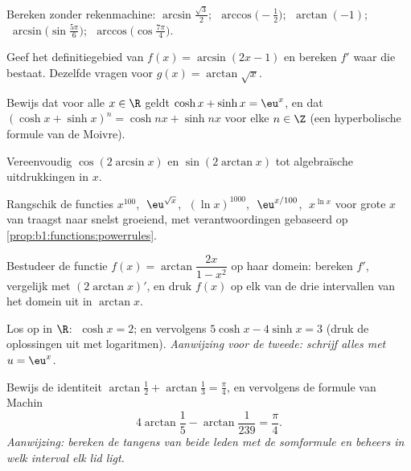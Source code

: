 \begin{exercise}[$\star$]\label{exo:b1:functions:1}
Bereken zonder rekenmachine: $\arcsin\frac{\sqrt 3}{2}$;
$\;\arccos\bigl(-\frac 12\bigr)$; $\;\arctan(-1)$;
$\;\arcsin\bigl(\sin\frac{5\pi}{6}\bigr)$;
$\;\arccos\bigl(\cos\frac{7\pi}{4}\bigr)$.
\end{exercise}

\begin{exercise}[$\star$]\label{exo:b1:functions:2}
Geef het definitiegebied van $f(x) = \arcsin(2x - 1)$ en bereken $f'$
waar die bestaat. Dezelfde vragen voor $g(x) = \arctan\sqrt{x}$.
\end{exercise}

\begin{exercise}[$\star$]\label{exo:b1:functions:3}
Bewijs dat voor alle $x \in \R$ geldt $\cosh x + \sinh x = \eu^x$, en dat
$(\cosh x + \sinh x)^n = \cosh nx + \sinh nx$ voor elke $n \in \Z$ (een
hyperbolische formule van de Moivre).
\end{exercise}

\begin{exercise}[$\star$]\label{exo:b1:functions:4}
Vereenvoudig $\cos(2\arcsin x)$ en $\sin(2\arctan x)$ tot algebraïsche
uitdrukkingen in $x$.
\end{exercise}

\begin{exercise}[$\star$]\label{exo:b1:functions:5}
Rangschik de functies $x^{100}$, $\;\eu^{\sqrt x}$, $\;(\ln x)^{1000}$,
$\;\eu^{x/100}$, $\;x^{\ln x}$ voor grote $x$ van traagst naar snelst
groeiend, met verantwoordingen gebaseerd op
\cref{prop:b1:functions:powerrules}.
\end{exercise}

\begin{exercise}[$\star\star$]\label{exo:b1:functions:6}
Bestudeer de functie $f(x) = \arctan\dfrac{2x}{1 - x^2}$ op haar
domein: bereken $f'$, vergelijk met $(2\arctan x)'$, en druk $f(x)$ op
elk van de drie intervallen van het domein uit in $\arctan x$.
\end{exercise}

\begin{exercise}[$\star\star$]\label{exo:b1:functions:7}
Los op in $\R$: $\;\cosh x = 2$; en vervolgens $5\cosh x - 4 \sinh x =
3$ (druk de oplossingen uit met logaritmen). \emph{Aanwijzing voor de
tweede: schrijf alles met $u = \eu^x$.}
\end{exercise}

\begin{exercise}[$\star\star$]\label{exo:b1:functions:8}
Bewijs de identiteit $\arctan\frac{1}{2} + \arctan\frac{1}{3} =
\frac{\pi}{4}$, en vervolgens de formule van
Machin
\[
4\arctan\frac 15 - \arctan\frac{1}{239} = \frac{\pi}{4}.
\]
\emph{Aanwijzing: bereken de tangens van beide leden met de somformule
en beheers in welk interval elk lid ligt.}
\end{exercise}

